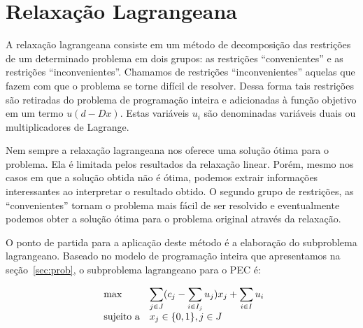 \documentclass{article}
\begin{document}
	\section{Relaxação Lagrangeana}\label{sec:relag}
	A relaxação lagrangeana consiste em um método de decomposição das restrições de um determinado problema em dois grupos: as restrições \enquote{convenientes} e as restrições \enquote{inconvenientes}. 
	{\color{red} Chamamos de restrições \enquote{inconvenientes} aquelas que fazem com que o problema se torne difícil de resolver. Dessa forma tais restrições são}
	retiradas do problema de programação inteira e adicionadas à função objetivo em um termo $u(d - Dx)$. Estas variáveis $u_i$ são denominadas variáveis duais ou multiplicadores de Lagrange.
	
	Nem sempre a relaxação lagrangeana nos oferece uma solução ótima para o problema. {\color{red} Ela é limitada pelos resultados da relaxação linear.} 
	Porém, mesmo nos casos em que a solução obtida não é ótima, podemos extrair informações interessantes ao interpretar o resultado obtido.
	O segundo grupo de restrições, as \enquote{convenientes} tornam o problema mais fácil de ser resolvido e eventualmente podemos obter a solução ótima para o problema original através da relaxação.
	
	O ponto de partida para a aplicação deste método é a elaboração do subproblema lagrangeano. Baseado no modelo de programação inteira que apresentamos na seção~\ref{sec:prob}, o subproblema lagrangeano para o PEC é: 
	
	\begin{equation*}
        \begin{array}{ll@{}ll}
            \text{max}  & \displaystyle\sum\limits_{j \in J} (c_{j} - \displaystyle\sum\limits_{i \in I_j} u_{j})x_j+  \displaystyle\sum\limits_{i \in I} u_{i}\\
            \text{sujeito a}
                 &                                                x_{j} \in \{0,1\}, j \in J
        \end{array}
    \end{equation*}
	
	 
	
\end{document}

